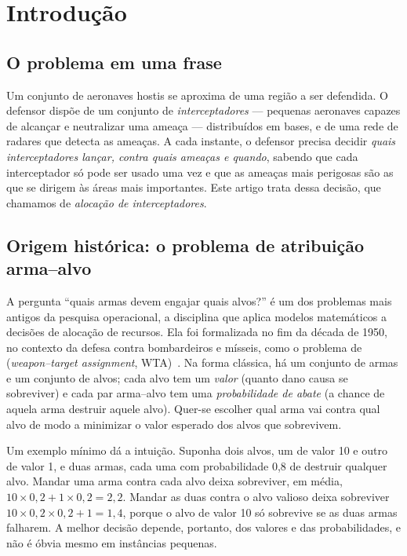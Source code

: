 \section{Introdução}\label{sec:intro}

\subsection{O problema em uma frase}
Um conjunto de aeronaves hostis se aproxima de uma região a ser defendida. O defensor dispõe de um conjunto de
\emph{interceptadores} --- pequenas aeronaves capazes de alcançar e neutralizar uma ameaça --- distribuídos em bases, e
de uma rede de radares que detecta as ameaças. A cada instante, o defensor precisa decidir \emph{quais interceptadores
lançar, contra quais ameaças e quando}, sabendo que cada interceptador só pode ser usado uma vez e que as ameaças
mais perigosas são as que se dirigem às áreas mais importantes. Este artigo trata dessa decisão, que chamamos de
\emph{alocação de interceptadores}.

\subsection{Origem histórica: o problema de atribuição arma--alvo}
A pergunta ``quais armas devem engajar quais alvos?'' é um dos problemas mais antigos da pesquisa operacional, a
disciplina que aplica modelos matemáticos a decisões de alocação de recursos. Ela foi formalizada no fim da década de
1950, no contexto da defesa contra bombardeiros e mísseis, como o problema de 
(\emph{weapon--target assignment}, WTA)~\cite{manne1958}. Na forma clássica, há um conjunto de armas e um conjunto de
alvos; cada alvo tem um \emph{valor} (quanto dano causa se sobreviver) e cada par arma--alvo tem uma
\emph{probabilidade de abate} (a chance de aquela arma destruir aquele alvo). Quer-se escolher qual arma vai contra qual
alvo de modo a minimizar o valor esperado dos alvos que sobrevivem.

Um exemplo mínimo dá a intuição. Suponha dois alvos, um de valor 10 e outro de valor 1, e duas armas, cada uma com
probabilidade 0,8 de destruir qualquer alvo. Mandar uma arma contra cada alvo deixa sobreviver, em média,
$10\times0{,}2+1\times0{,}2=2{,}2$. Mandar as duas contra o alvo valioso deixa sobreviver
$10\times0{,}2\times0{,}2+1=1{,}4$, porque o alvo de valor 10 só sobrevive se as duas armas falharem. A melhor decisão
depende, portanto, dos valores e das probabilidades, e não é óbvia mesmo em instâncias pequenas.

